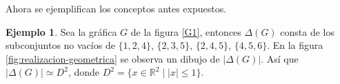 \documentclass[12pt]{book}
\theoremstyle{definition}
\newtheorem{example}[theorem]{Ejemplo}
\newcounter{in}
\newcounter{ini}
\begin{document}
Ahora se ejemplifican los conceptos antes expuestos.
\begin{example}
  Sea la gráfica $G$ de la figura \ref{G1}, entonces $\Delta(G)$ consta de los
  subconjuntos no vacíos de $\{1,2,4\}$, $\{2,3,5\}$, $\{2,4,5\}$,
  $\{4,5,6\}$. En la figura \ref{fig:realizacion-geometrica} se
  observa un dibujo de $|\Delta(G)|$. Así que $|\Delta(G)|\simeq D^{2}$, donde $D^{2}=\{x\in\mathbb{R}^{2}
\mid |x|\leq 1\}$.

\begin{center}
  \begin{figure}[h]
    \begin{minipage}[h]{0.45\linewidth}
      \centering
    

\end{minipage}
\end{figure}
\end{center}
\end{example}
\end{document}
